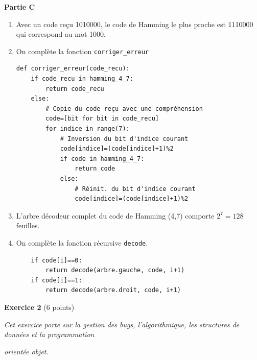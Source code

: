 \documentclass[11pt,a4paper]{article}
\newcommand{\mip}[1]{\texttt{#1}}
\begin{document}
\textbf{Partie C}

\begin{enumerate}[resume]
\item Avec un code reçu 1010000, le code de Hamming le plus proche est 1110000 qui correspond au mot 1000.

\item On complète la fonction \mip{corriger_erreur}

\begin{verbatim}
def corriger_erreur(code_recu):
    if code_recu in hamming_4_7:
        return code_recu
    else:
        # Copie du code reçu avec une compréhension
        code=[bit for bit in code_recu]
        for indice in range(7):
            # Inversion du bit d'indice courant
            code[indice]=(code[indice]+1)%2
            if code in hamming_4_7:
                return code
            else:
                # Réinit. du bit d'indice courant
                code[indice]=(code[indice]+1)%2
\end{verbatim}

\item L'arbre décodeur complet du code de Hamming (4,7) comporte $2^7=128$ feuilles. 

\newpage

\item On complète la fonction récursive \mip{decode}.

\begin{verbatim}
    if code[i]==0:
        return decode(arbre.gauche, code, i+1)
    if code[i]==1:
        return decode(arbre.droit, code, i+1)
\end{verbatim}

\end{enumerate}




\bigskip

\textbf{Exercice 2} (6 points)

\medskip

\textit{Cet exercice porte sur la gestion des bugs, l’algorithmique, les structures de données et la programmation}

\textit{orientée objet.}

\smallskip
\end{document}
